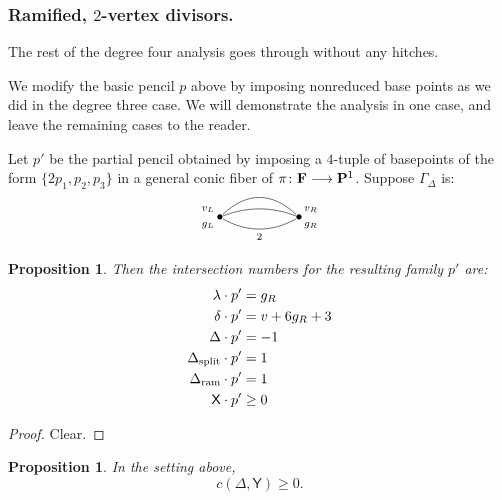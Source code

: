\documentclass[reqno, 10 pt]{article}
\newtheorem{prop}[thm]{Proposition}
\theoremstyle{definition}
\theoremstyle{remark}
\numberwithin{equation}{section}
\numberwithin{thm}{section}
\numberwithin{prop}{section}
\numberwithin{lem}{section}
\numberwithin{cor}{section}
\numberwithin{conj}{section}
\numberwithin{defn}{section}
\newcommand{\F}{{\mathbf F}}
\newcommand{\sfY}{{\mathsf Y}}
\newcommand{\sfX}{{\mathsf X}}
\renewcommand{\F}{{\bf F}}
\newcommand {\spl}{{\rm split}}
\newcommand {\ram}{{\rm ram}}
\begin{document}
\subsubsection{Ramified, $2$-vertex divisors.} The rest of the degree four analysis goes through without any hitches. 

We modify the basic pencil $p$ above by imposing nonreduced base points as we did in the degree three case.  We will demonstrate the analysis in one case, and leave the remaining cases to the reader.


  Let $p'$ be the partial pencil obtained by imposing a $4$-tuple of basepoints of the form $\{2p_1, p_2, p_3\}$ in a general conic fiber of $\pi \colon \F \longrightarrow {\bf P}^1$.  Suppose $\Gamma_{\Delta}$ is:\[   \xygraph{
!{<0cm,0cm>;<1cm,0cm>:<0cm,1cm>::}
!{(0,0) }*{\bullet}="l"!{(-.3,.2)}{\scriptstyle v_L}!{(-.3,-.2)}{\scriptstyle g_L}
!{(2,0) }*{\bullet}="r"!{(2.3,.2)}{\scriptstyle v_R}!{(2.3,-.2)}{\scriptstyle g_R}
 "l"-@/^.5cm/"r"  
"l"-@/^/"r" 
"l"-@/_.3cm/"r" _{\scriptstyle 2}
}  \] 

\begin{prop}\label{tetra2}
Then the intersection numbers for the resulting family $p'$ are: 
\begin{align*}
\lambda \cdot p' &= g_R\\
\delta \cdot p' &= v+6g_R+3\\
\Delta \cdot p' &= -1\\
\Delta_{\spl} \cdot p' &= 1\\
\Delta_{\ram} \cdot p' &= 1\\
{\sfX} \cdot p' &\geq 0
\end{align*}
\end{prop}

\begin{proof}
Clear.
\end{proof}

\begin{prop}
In the setting above, $$c(\Delta, \sfY) \geq 0.$$
\end{prop}
\end{document}
